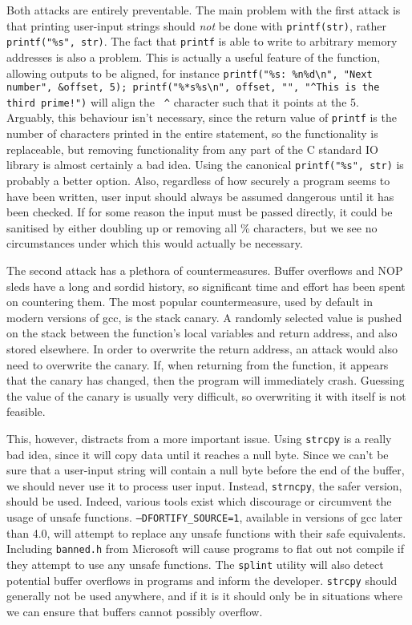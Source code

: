 Both attacks are entirely preventable. The main problem with the first attack is that printing user-input strings should
\emph{not} be done with {\tt printf(str)}, rather {\tt printf("\%s", str)}. The fact that {\tt printf} is able to write
to arbitrary memory addresses is also a problem. This is actually a useful feature of the function, allowing outputs to
be aligned, for instance {\tt printf("\%s: \%n\%d\textbackslash n", "Next number", \&offset, 5);
printf("\%*s\%s\textbackslash n", offset, "", "\textasciicircum This is the third prime!")} will align the {\tt
\textasciicircum} character such that it points at the 5. Arguably, this behaviour isn't necessary, since the return
value of {\tt printf} is the number of characters printed in the entire statement, so the functionality is replaceable,
but removing functionality from any part of the C standard IO library is almost certainly a bad idea. Using the
canonical {\tt printf("\%s", str)} is probably a better option. Also, regardless of how securely a program seems to have
been written, user input should always be assumed dangerous until it has been checked. If for some reason the input must
be passed directly, it could be sanitised by either doubling up or removing all \% characters, but we see no
circumstances under which this would actually be necessary.

The second attack has a plethora of countermeasures. Buffer overflows and NOP sleds have a long and sordid history, so
significant time and effort has been spent on countering them. The most popular countermeasure, used by default in
modern versions of gcc, is the stack canary. A randomly selected value is pushed on the stack between the function's
local variables and return address, and also stored elsewhere. In order to overwrite the return address, an attack would
also need to overwrite the canary. If, when returning from the function, it appears that the canary has changed, then
the program will immediately crash. Guessing the value of the canary is usually very difficult, so overwriting it with
itself is not feasible.

This, however, distracts from a more important issue. Using {\tt strcpy} is a really bad idea, since it will copy data
until it reaches a null byte. Since we can't be sure that a user-input string will contain a null byte before the end of
the buffer, we should never use it to process user input. Instead, {\tt strncpy}, the safer version, should be used.
Indeed, various tools exist which discourage or circumvent the usage of unsafe functions.
{\tt --DFORTIFY\_SOURCE=1}, available in versions of gcc later than 4.0, will attempt to replace any unsafe functions
with their safe equivalents. Including {\tt banned.h} from Microsoft
will cause programs to flat out not compile if they attempt to use any unsafe functions. The {\tt splint} utility will
also detect potential buffer overflows in programs and inform the developer. {\tt strcpy} should generally not be used
anywhere, and if it is it should only be in situations where we can ensure that buffers cannot possibly overflow.

